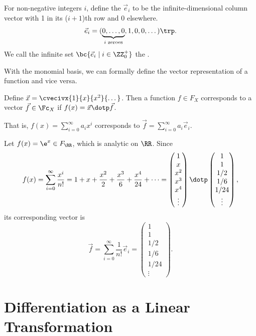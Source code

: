 \begin{definition}
    For non-negative integers $i$, define the  $\vec e_i$ to be the infinite-dimensional column vector with 1 in its ($i+1$)th row and 0 elsewhere. \[\vec e_i = (\underbrace{0, \dots, 0}_{\text{$i$ zeroes}}, 1, 0, 0, \dots)\trp.\] We call the infinite set $\bc{\vec e_i \mid i \in \ZZ_0^+}$ the .
\end{definition}

With the monomial basis, we can formally define the vector representation of a function and vice versa.

\begin{definition}
    Define $\vec x = \cvecivx{1}{x}{x^2}{\dots}$. Then a function $f \in F_X$ corresponds to a vector $\vec f \in \Fc_X$ if $f(x) = \vec x \dotp \vec f$.
\end{definition}

That is, $f(x) = \sum_{i = 0}^\infty a_i x^i$ corresponds to $\vec f = \sum_{i = 0}^\infty a_i \vec e_i$.

\begin{example}
    Let $f(x) = \e^x \in F_{\RR}$, which is analytic on $\RR$. Since \[f(x) = \sum_{i = 0}^\infty \frac{x^i}{n!} = 1 + x + \frac{x^2}{2} + \frac{x^3}{6} + \frac{x^4}{24} + \dots = \begin{pmatrix}1  \\ x \\ x^2 \\ x^3 \\ x^4 \\ \vdots\end{pmatrix} \dotp \begin{pmatrix}1\\1\\1/2\\1/6\\1/24\\\vdots\end{pmatrix},\] its corresponding vector is \[\vec f = \sum_{i = 0}^\infty \frac{1}{n!} \vec e_i = \begin{pmatrix}1\\1\\1/2\\1/6\\1/24\\\vdots\end{pmatrix}.\]
\end{example}

\section{Differentiation as a Linear Transformation}

